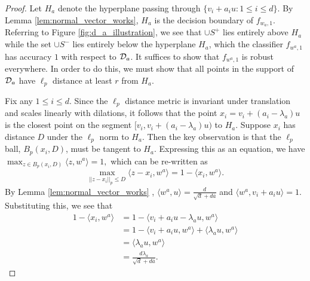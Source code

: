 \begin{proof}
Let $H_a$ denote the hyperplane passing through $\{v_i + a_iu: 1 \leq i \leq d\}$. By Lemma \ref{lem:normal_vector_works}, $H_a$ is the decision boundary of $f_{w_a, 1}$.  Referring to Figure \ref{fig:d_a_illustration}, we see that $\cup S^+$ lies entirely above $H_a$ while the set $\cup S^-$ lies entirely below the hyperplane $H_a$, which the classifier $f_{w^a, 1}$ has accuracy $1$ with respect to ${\mathcal D}_a$. It suffices to show that $f_{w^a, 1}$ is robust everywhere. In order to do this, we must show that all points in the support of ${\mathcal D}_a$ have $\ell_p$ distance at least $r$ from $H_a$. 

Fix any $1 \leq i \leq d$. Since the $\ell_p$ distance metric is invariant under translation and scales linearly with dilations, it follows that the point $x_i = v_i + (a_i - \lambda_a)u$ is the closest point on the segment $[v_i, v_i+(a_i - \lambda_a)u)$ to $H_a$. Suppose $x_i$ has distance $D$ under the $\ell_p$ norm to $H_a$. Then the key observation is that the $\ell_p$ ball, $B_p(x_i, D)$, must be tangent to $H_a$. Expressing this as an equation, we have $\max_{z \in B_p(x_i, D)} \langle z, w^a \rangle = 1,$ which can be re-written as $$\max_{||z - x_i||_p \leq D} \langle z - x_i, w^a \rangle = 1 - \langle x_i, w^a \rangle.$$ By Lemma \ref{lem:normal_vector_works} , $\langle w^a, u \rangle = \frac{d}{\sqrt{d} + d\overline{a}}$ and $\langle w^a, v_i + a_iu \rangle = 1$. Substituting this, we see that 
\begin{equation*}
\begin{split}
1 - \langle x_i, w^a \rangle &= 1 - \langle v_i + a_iu - \lambda_a u, w^a \rangle \\
&= 1 - \langle v_i + a_iu, w^a \rangle + \langle \lambda_a u, w^a \rangle \\
&= \langle \lambda_a u, w^a \rangle \\
&= \frac{d\lambda_a}{\sqrt{d} + d\overline{a}}.
\end{split}
\end{equation*}


\end{proof}
